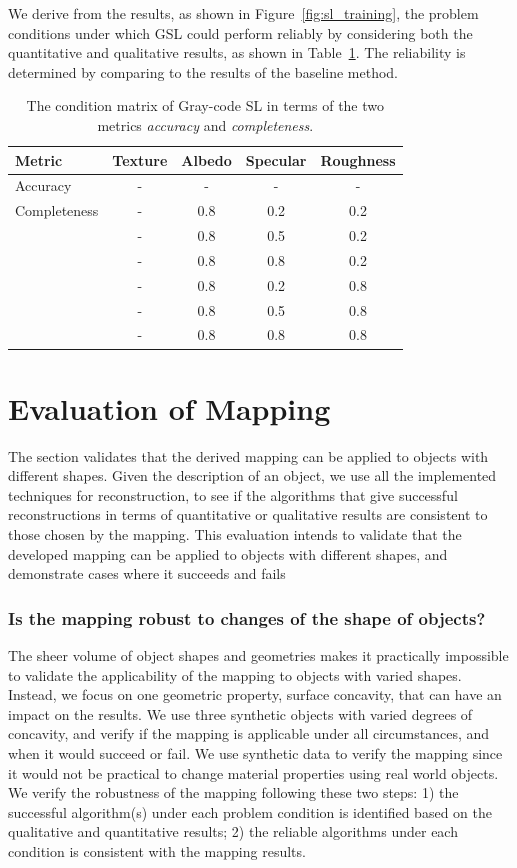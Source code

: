 We derive from the results, as shown in Figure~\ref{fig:sl_training}, the problem conditions under which GSL could perform reliably by considering both the quantitative and qualitative results, as shown in Table~\ref{tab:sl_training_result}. The reliability is determined by comparing to the results of the baseline method.
\begin{table}[!htbp]
  \centering
  \begin{tabular}{l*{4}{c}}
  \hline
  \textbf{Metric} & Texture & Albedo & Specular & Roughness\\
  \hline
  Accuracy     & - & - & - & -\\
  \hline
  Completeness & - & 0.8 & 0.2 & 0.2\\
               & - & 0.8 & 0.5 & 0.2\\
               & - & 0.8 & 0.8 & 0.2\\
               & - & 0.8 & 0.2 & 0.8\\
               & - & 0.8 & 0.5 & 0.8\\
               & - & 0.8 & 0.8 & 0.8\\
  \hline
  \end{tabular}
  \caption{The condition matrix of Gray-code SL in terms of the two metrics \textit{accuracy} and \textit{completeness}.}
  \label{tab:sl_training_result}
\end{table}

\section{Evaluation of Mapping}
\label{sec:eval_mapping}
The section validates that the derived mapping can be applied to objects with different shapes. Given the description of an object, we use all the implemented techniques for reconstruction, to see if the algorithms that give successful reconstructions in terms of quantitative or qualitative results are consistent to those chosen by the mapping. This evaluation intends to validate that the developed mapping can be applied to objects with different shapes, and demonstrate cases where it succeeds and fails

\subsubsection{Is the mapping robust to changes of the shape of objects?}
The sheer volume of object shapes and geometries makes it practically impossible to validate the applicability of the mapping to objects with varied shapes. Instead, we focus on one geometric property, surface concavity, that can have an impact on the results. We use three synthetic objects with varied degrees of concavity, and verify if the mapping is applicable under all circumstances, and when it would succeed or fail. We use synthetic data to verify the mapping since it would not be practical to change material properties using real world objects. We verify the robustness of the mapping following these two steps: 1) the successful algorithm(s) under each problem condition is identified based on the qualitative and quantitative results; 2) the reliable algorithms under each condition is consistent with the mapping results.

